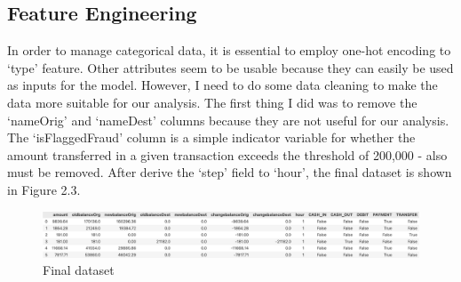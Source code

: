 \subsection{Feature Engineering}
In order to manage categorical data, it is essential to employ one-hot encoding to `type' feature. Other attributes seem to be usable because they can easily be used as inputs for the model. However, I need to do some data cleaning to make the data more suitable for our analysis. The first thing I did was to remove the `nameOrig' and `nameDest' columns because they are not useful for our analysis. The ‘isFlaggedFraud’ column is a simple indicator variable for whether the amount transferred in a given transaction exceeds the threshold of 200,000 - also must be removed. After derive the `step' field to `hour', the final dataset is shown in Figure 2.3.

\begin{figure}[H]
    \centering
    \includegraphics[width=\linewidth]{body/02_methodology/img/figure2.png}
    \caption{Final dataset}
\end{figure}
